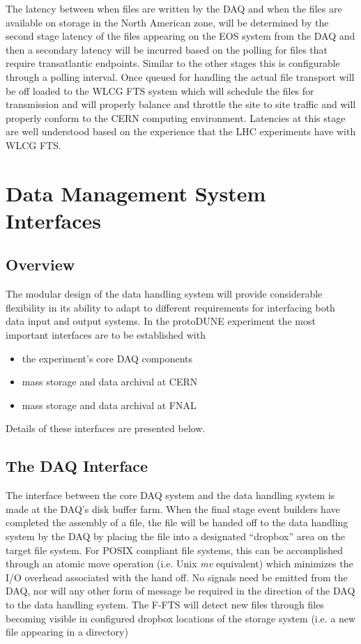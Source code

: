 \documentclass[12pt]{article}
\newcommand{\pd}{protoDUNE\xspace}
\begin{document}
The latency between when files are written by the DAQ and when the files are available on storage in the North American zone,
will be determined by the second stage latency of the files appearing on the EOS system from the DAQ and then a secondary latency
will be incurred based on the polling for files that require transatlantic endpoints.  Similar to the other stages this is configurable
through a polling interval.  Once queued for handling the actual file transport will be off loaded to the WLCG FTS system which will
schedule the files for transmission and will properly balance and throttle the site to site traffic and will properly conform to the CERN
 computing environment.  Latencies at this stage are well understood based on the experience that the LHC experiments have with WLCG FTS.  

\section{Data Management System Interfaces}
\subsection{Overview}
The modular design of the data handling system will provide considerable flexibility in its ability to adapt to different requirements
for interfacing  both data input and output systems.  In the \pd experiment the most important interfaces are to be established with
\begin{itemize}
\item the experiment’s core DAQ components
\item mass storage and data archival at CERN
\item mass storage and data archival at FNAL
\end{itemize}

\noindent
 Details of these interfaces are presented below.

\subsection{The DAQ Interface}
The interface between the core DAQ system and the data handling system is made at the DAQ’s disk buffer farm.
When the final stage event builders have completed the assembly of a file, the file will be handed off to the data handling system
by the DAQ by placing the file into a designated ``dropbox'' area on the target file system.  For POSIX compliant file systems,
this can be accomplished through an atomic move operation (i.e. Unix \textit{mv} equivalent) which minimizes the I/O overhead associated
with the hand off.  No signals need be emitted from the DAQ, nor will any other form of message be required in the direction of the
DAQ to the data handling system.  The F-FTS will detect new files through files becoming visible in configured dropbox locations of
the storage system (i.e. a new file appearing in a directory) 
\end{document}
